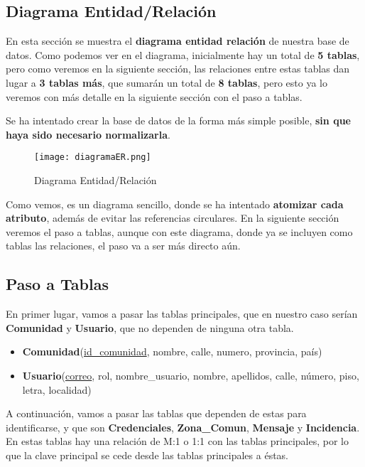 \subsection{Diagrama Entidad/Relación}
En esta sección se muestra el \textbf{diagrama entidad relación} de nuestra base de datos. Como podemos ver en el diagrama, inicialmente hay un total de \textbf{5 tablas}, pero como veremos en la siguiente sección, las relaciones entre estas tablas dan lugar a \textbf{3 tablas más}, que sumarán un total de \textbf{8 tablas}, pero esto ya lo veremos con más detalle en la siguiente sección con el paso a tablas.

Se ha intentado crear la base de datos de la forma más simple posible, \textbf{sin que haya sido necesario normalizarla}.

\begin{figure}[H]
	\centering
	\texttt{[image: diagramaER.png]}
	\caption{Diagrama Entidad/Relación}
\end{figure}

Como vemos, es un diagrama sencillo, donde se ha intentado \textbf{atomizar cada atributo}, además de evitar las referencias circulares. En la siguiente sección veremos el paso a tablas, aunque con este diagrama, donde ya se incluyen como tablas las relaciones, el paso va a ser más directo aún.

\subsection{Paso a Tablas}
En primer lugar, vamos a pasar las tablas principales, que en nuestro caso serían \textbf{Comunidad} y \textbf{Usuario}, que no dependen de ninguna otra tabla.

\begin{itemize}
	\item \textbf{Comunidad}(\underline{id\_comunidad}, nombre, calle, numero, provincia, país)
	\item \textbf{Usuario}(\underline{correo}, rol, nombre\_usuario, nombre, apellidos, calle, número, piso, letra, localidad)
\end{itemize}

A continuación, vamos a pasar las tablas que dependen de estas para identificarse, y que son \textbf{Credenciales}, \textbf{Zona\_Comun}, \textbf{Mensaje} y \textbf{Incidencia}. En estas tablas hay una relación de M:1 o 1:1 con las tablas principales, por lo que la clave principal se cede desde las tablas principales a éstas.

